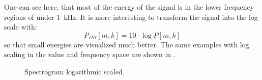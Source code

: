 \FloatBarrier
\noindent
One can see here, that most of the energy of the signal is in the lower frequency regions of under \SI{1}{\kilo\hertz}.
It is more interesting to transform the signal into the log scale with:
\begin{equation}\label{eq:signal_spec_log}
  P_{DB}[m, k] = 10 \cdot \log{P[m, k]}
\end{equation}
so that small energies are visualized much better. 
The same examples with log scaling in the value and frequency space are shown in .
\begin{figure}[!ht]
  \centering
  \caption{Spectrogram logarithmic scaled.}
  \label{fig:signal_spec_log_showcase}
\end{figure}

